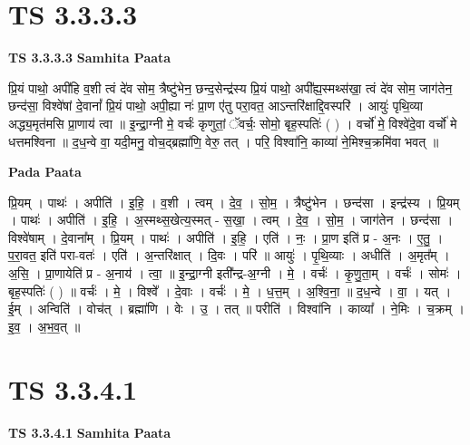 \documentclass[17pt]{extarticle}
\begin{document}
\section*{ TS 3.3.3.3 }

\textbf{TS 3.3.3.3 } \newline
\textbf{Samhita Paata} \newline

प्रि॒यं पाथो॒ अपी॑हि व॒शी त्वं दे॑व सोम॒ त्रैष्टु॑भेन॒ छन्द॒सेन्द्र॑स्य प्रि॒यं पाथो॒ अपी᳚ह्य॒स्मथ्स॑खा॒ त्वं दे॑व सोम॒ जाग॑तेन॒ छन्द॑सा॒ विश्वे॑षां दे॒वानां᳚ प्रि॒यं पाथो॒ अपी॒ह्या नः॑ प्रा॒ण ए॑तु परा॒वत॒ आऽन्तरि॑क्षाद्दि॒वस्परि॑ । आयुः॑ पृथि॒व्या अद्ध्य॒मृत॑मसि प्रा॒णाय॑ त्वा ॥ इ॒न्द्रा॒ग्नी मे॒ वर्चः॑ कृणुतां॒ ॅवर्चः॒ सोमो॒ बृह॒स्पतिः॑ ( ) । वर्चो॑ मे॒ विश्वे॑दे॒वा वर्चो॑ मे धत्तमश्विना ॥ द॒ध॒न्वे वा॒ यदी॒मनु॒ वोच॒द्ब्रह्मा॑णि॒ वेरु॒ तत् । परि॒ विश्वा॑नि॒ काव्या॑ ने॒मिश्च॒क्रमि॑वा भवत् ॥ \newline

\textbf{Pada Paata} \newline

प्रि॒यम् । पाथः॑ । अपीति॑ । इ॒हि॒ । व॒शी । त्वम् । दे॒व॒ । सो॒म॒ । त्रैष्टु॑भेन । छन्द॑सा । इन्द्र॑स्य । प्रि॒यम् । पाथः॑ । अपीति॑ । इ॒हि॒ । अ॒स्मथ्स॒खेत्य॒स्मत् - स॒खा॒ । त्वम् । दे॒व॒ । सो॒म॒ । जाग॑तेन । छन्द॑सा । विश्वे॑षाम् । दे॒वाना᳚म् । प्रि॒यम् । पाथः॑ । अपीति॑ । इ॒हि॒ । एति॑ । नः॒ । प्रा॒ण इति॑ प्र - अ॒नः । ए॒तु॒ । प॒रा॒वत॒ इति॑ परा-वतः॑ । एति॑ । अ॒न्तरि॑क्षात् । दि॒वः । परि॑ ॥ आयुः॑ । पृ॒थि॒व्याः । अधीति॑ । अ॒मृत᳚म् । अ॒सि॒ । प्रा॒णायेति॑ प्र - अ॒नाय॑ । त्वा॒ ॥ इ॒न्द्रा॒ग्नी इती᳚न्द्र-अ॒ग्नी । मे॒ । वर्चः॑ । कृ॒णु॒ता॒म् । वर्चः॑ । सोमः॑ । बृह॒स्पतिः॑ ( ) ॥ वर्चः॑ । मे॒ । विश्वे᳚ । दे॒वाः । वर्चः॑ । मे॒ । ध॒त्त॒म् । अ॒श्वि॒ना॒ ॥ द॒ध॒न्वे । वा॒ । यत् । ई॒म् । अन्विति॑ । वोच॑त् । ब्रह्मा॑णि । वेः । उ॒ । तत् ॥ परीति॑ । विश्वा॑नि । काव्या᳚ । ने॒मिः । च॒क्रम् । इ॒व॒ । अ॒भ॒व॒त् ॥  \newline




\section*{ TS 3.3.4.1 }

\textbf{TS 3.3.4.1 } \newline
\textbf{Samhita Paata} \newline
\end{document}
